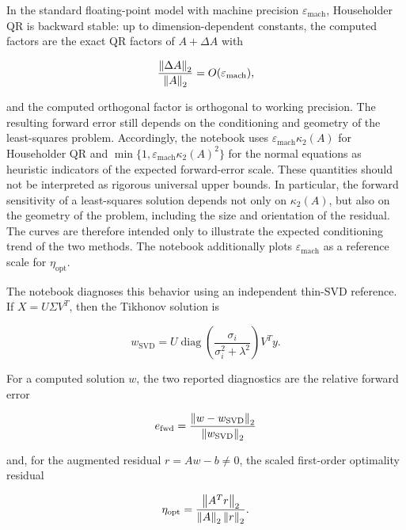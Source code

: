 \noindent In the standard floating-point model with machine precision
$\varepsilon_{\mathrm{mach}}$, Householder QR is backward stable: up to
dimension-dependent constants, the computed factors are the exact QR factors
of $A+\Delta A$ with

\begin{equation}
    \frac{\left\|\Delta A\right\|_2}{\left\|A\right\|_2}=O(\varepsilon_{\mathrm{mach}}),
\end{equation}

\noindent and the computed orthogonal factor is orthogonal to working precision. The resulting forward error still depends on the conditioning and geometry of the least-squares problem. Accordingly, the notebook uses $\varepsilon_{\mathrm{mach}} \kappa_2(A)$ for Householder QR and $\min\{1,\varepsilon_{\mathrm{mach}} \kappa_2(A)^2\}$ for the normal equations as heuristic indicators of the expected forward-error scale. These quantities should not be interpreted as rigorous universal upper bounds. In particular, the forward sensitivity of a least-squares solution depends not only on $\kappa_2(A)$, but also on the geometry of the problem, including the size and orientation of the residual. The curves are therefore intended only to illustrate the expected conditioning trend of the two methods. The notebook additionally plots $\varepsilon_{\mathrm{mach}}$ as a reference scale for $\eta_{\mathrm{opt}}$.

\noindent The notebook diagnoses this behavior using an independent thin-SVD
reference. If $X=U\Sigma V^T$, then the Tikhonov solution is

\begin{equation}
\label{eq:qr_svd_reference}
    w_{\mathrm{SVD}}
    =U\operatorname{diag}\!\left(
        \frac{\sigma_i}{\sigma_i^2+\lambda^2}
      \right)V^T y.
\end{equation}

\noindent For a computed solution $w$, the two reported diagnostics are the
relative forward error

\begin{equation}
\label{eq:qr_forward_error}
    e_{\mathrm{fwd}}
    =\frac{\left\|w-w_{\mathrm{SVD}}\right\|_2}{\left\|w_{\mathrm{SVD}}\right\|_2}
\end{equation}

\noindent and, for the augmented residual $r=Aw-b\neq0$, the scaled first-order
optimality residual

\begin{equation}
\label{eq:qr_scaled_optimality}
    \eta_{\mathrm{opt}}
    =\frac{\left\|A^T r\right\|_2}{\left\|A\right\|_2\left\|r\right\|_2}.
\end{equation}

